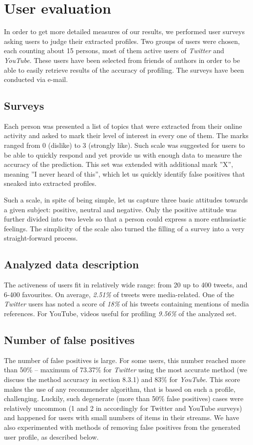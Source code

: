 \section{User evaluation}
In order to get more detailed measures of our results, we performed user surveys
asking users to judge their extracted profiles. Two groups of users were chosen,
each counting about 15 persons, most of them active users of \textit{Twitter} and \textit{YouTube}.
These users have been selected from friends of authors in order to be able to easily
retrieve results of the accuracy of profiling. The surveys have been conducted via
e-mail.

\subsection{Surveys}

Each person was presented a list of topics that were extracted from their online
activity and asked to mark their level of interest in every one of
them. The marks ranged from 0 (dislike) to 3 (strongly like).
Such scale was suggested for users to be able to quickly respond
and yet provide us with enough data to measure the accuracy of the prediction.
This set was extended with additional mark ''X'', meaning
''I never heard of this'', which let us quickly identify false positives that
sneaked into extracted profiles.

Such a scale, in spite of being simple, let us capture three basic attitudes
towards a given subject: positive, neutral and negative. Only the positive
attitude was further divided into two levels so that a person could express a
more enthusiastic feelings. The simplicity of the scale also turned the filling
of a survey into a very straight-forward process.

\subsection{Analyzed data description}
The activeness of users fit in relatively wide range: from 20 up to 400 tweets,
and 6-400 favourites. On average, \textit{2.51\%} of tweets were media-related.
One of the \textit{Twitter} users has noted a score of \textit{18\%} of his
tweets containing mentions of media references. For YouTube, videos useful
for profiling \textit{9.56\%} of the analyzed set.

\subsection{Number of false positives}
The number of false positives is large. For some users, this
number reached more than 50\% -- maximum of 73.37\% for \textit{Twitter} using the most accurate method (we discuss
the method accuracy in section 8.3.1) and 83\% for \textit{YouTube}. This score makes the use of any recommender
algorithm, that is based on such a profile, challenging. Luckily, such degenerate
(more than 50\% false positives) cases were relatively uncommon (1 and 2 in accordingly for
Twitter and YouTube surveys) and happened for users with small numbers of items in their streams.
We have also experimented with methods of removing false positives from the generated user profile,
as described below.

